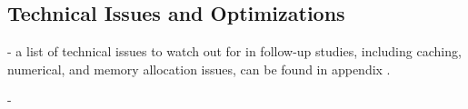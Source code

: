 
\subsection{Technical Issues and Optimizations}
\label{sec:technical_issues_and_optimizations}

- a list of technical issues to watch out for in follow-up studies, including caching, numerical, and memory allocation issues, can be found in appendix \mref{}.

- 

